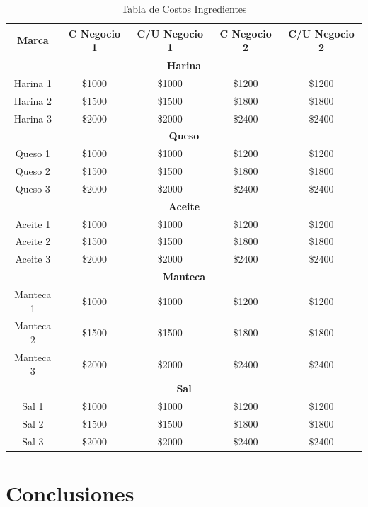 \documentclass[12pt]{article}
\begin{document}
\begin{table}[h!]
    \centering
    \begin{tabular}{|| c | c | c | c | c||} %
        \hline
        \textbf{Marca} & \textbf{C Negocio 1} & \textbf{C/U Negocio 1} & \textbf{C Negocio 2} & \textbf{C/U Negocio 2} \\ [0.5ex]
        \hline\hline

        \multicolumn{5}{||c||}{\textbf{Harina}} \\ [0.5ex] \hline \hline
        Harina 1 & \$1000 & \$1000 & \$1200 & \$1200 \\ \hline
        Harina 2 & \$1500 & \$1500 & \$1800 & \$1800 \\ \hline
        Harina 3 & \$2000 & \$2000 & \$2400 & \$2400 \\ [1ex] \hline \hline

        \multicolumn{5}{||c||}{\textbf{Queso}} \\ [0.5ex] \hline \hline
        Queso 1 & \$1000 & \$1000 & \$1200 & \$1200 \\ \hline
        Queso 2 & \$1500 & \$1500 & \$1800 & \$1800 \\ \hline
        Queso 3 & \$2000 & \$2000 & \$2400 & \$2400 \\ [1ex] \hline \hline

        \multicolumn{5}{||c||}{\textbf{Aceite}} \\ [0.5ex] \hline \hline
        Aceite 1 & \$1000 & \$1000 & \$1200 & \$1200 \\ \hline
        Aceite 2 & \$1500 & \$1500 & \$1800 & \$1800 \\ \hline
        Aceite 3 & \$2000 & \$2000 & \$2400 & \$2400 \\ [1ex] \hline \hline

        \multicolumn{5}{||c||}{\textbf{Manteca}} \\ [0.5ex] \hline \hline
        Manteca 1 & \$1000 & \$1000 & \$1200 & \$1200 \\ \hline
        Manteca 2 & \$1500 & \$1500 & \$1800 & \$1800 \\ \hline
        Manteca 3 & \$2000 & \$2000 & \$2400 & \$2400 \\ [1ex] \hline \hline

        \multicolumn{5}{||c||}{\textbf{Sal}} \\ [0.5ex] \hline \hline
        Sal 1 & \$1000 & \$1000 & \$1200 & \$1200 \\ \hline
        Sal 2 & \$1500 & \$1500 & \$1800 & \$1800 \\ \hline
        Sal 3 & \$2000 & \$2000 & \$2400 & \$2400 \\ [1ex] \hline \hline

    \end{tabular}
    \caption{Tabla de Costos Ingredientes}
    \label{tab:costos_ingredientes}
\end{table}

\newpage



\section{Conclusiones} %
\end{document}
